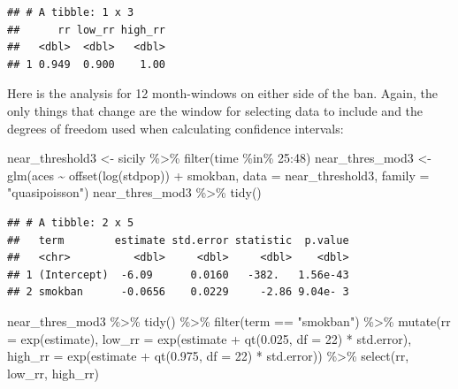\documentclass[
]{book}
\newenvironment{Shaded}{\begin{snugshade}}{\end{snugshade}}
\newcommand{\AttributeTok}[1]{\textcolor[rgb]{0.77,0.63,0.00}{#1}}
\newcommand{\DecValTok}[1]{\textcolor[rgb]{0.00,0.00,0.81}{#1}}
\newcommand{\FloatTok}[1]{\textcolor[rgb]{0.00,0.00,0.81}{#1}}
\newcommand{\FunctionTok}[1]{\textcolor[rgb]{0.00,0.00,0.00}{#1}}
\newcommand{\NormalTok}[1]{#1}
\newcommand{\OtherTok}[1]{\textcolor[rgb]{0.56,0.35,0.01}{#1}}
\newcommand{\SpecialCharTok}[1]{\textcolor[rgb]{0.00,0.00,0.00}{#1}}
\newcommand{\StringTok}[1]{\textcolor[rgb]{0.31,0.60,0.02}{#1}}
\begin{document}
\begin{verbatim}
## # A tibble: 1 x 3
##      rr low_rr high_rr
##   <dbl>  <dbl>   <dbl>
## 1 0.949  0.900    1.00
\end{verbatim}

Here is the analysis for 12 month-windows
on either side of the ban. Again, the only things that change are the window for selecting data to include and the degrees of freedom used when calculating confidence intervals:

\begin{Shaded}
\begin{Highlighting}[]
\NormalTok{near\_threshold3 }\OtherTok{\textless{}{-}}\NormalTok{ sicily }\SpecialCharTok{\%\textgreater{}\%} 
  \FunctionTok{filter}\NormalTok{(time }\SpecialCharTok{\%in\%} \DecValTok{25}\SpecialCharTok{:}\DecValTok{48}\NormalTok{)}
\NormalTok{near\_thres\_mod3 }\OtherTok{\textless{}{-}} \FunctionTok{glm}\NormalTok{(aces }\SpecialCharTok{\textasciitilde{}} \FunctionTok{offset}\NormalTok{(}\FunctionTok{log}\NormalTok{(stdpop)) }\SpecialCharTok{+}\NormalTok{ smokban, }
                      \AttributeTok{data =}\NormalTok{ near\_threshold3, }
                      \AttributeTok{family =} \StringTok{"quasipoisson"}\NormalTok{)}
\NormalTok{near\_thres\_mod3 }\SpecialCharTok{\%\textgreater{}\%} 
  \FunctionTok{tidy}\NormalTok{()}
\end{Highlighting}
\end{Shaded}

\begin{verbatim}
## # A tibble: 2 x 5
##   term        estimate std.error statistic  p.value
##   <chr>          <dbl>     <dbl>     <dbl>    <dbl>
## 1 (Intercept)  -6.09      0.0160   -382.   1.56e-43
## 2 smokban      -0.0656    0.0229     -2.86 9.04e- 3
\end{verbatim}

\begin{Shaded}
\begin{Highlighting}[]
\NormalTok{near\_thres\_mod3 }\SpecialCharTok{\%\textgreater{}\%} 
  \FunctionTok{tidy}\NormalTok{() }\SpecialCharTok{\%\textgreater{}\%} 
  \FunctionTok{filter}\NormalTok{(term }\SpecialCharTok{==} \StringTok{"smokban"}\NormalTok{) }\SpecialCharTok{\%\textgreater{}\%} 
  \FunctionTok{mutate}\NormalTok{(}\AttributeTok{rr =} \FunctionTok{exp}\NormalTok{(estimate), }
         \AttributeTok{low\_rr =} \FunctionTok{exp}\NormalTok{(estimate }\SpecialCharTok{+} \FunctionTok{qt}\NormalTok{(}\FloatTok{0.025}\NormalTok{, }\AttributeTok{df =} \DecValTok{22}\NormalTok{) }\SpecialCharTok{*}\NormalTok{ std.error), }
         \AttributeTok{high\_rr =} \FunctionTok{exp}\NormalTok{(estimate }\SpecialCharTok{+} \FunctionTok{qt}\NormalTok{(}\FloatTok{0.975}\NormalTok{, }\AttributeTok{df =} \DecValTok{22}\NormalTok{) }\SpecialCharTok{*}\NormalTok{ std.error)) }\SpecialCharTok{\%\textgreater{}\%} 
  \FunctionTok{select}\NormalTok{(rr, low\_rr, high\_rr)}
\end{Highlighting}
\end{Shaded}
\end{document}
